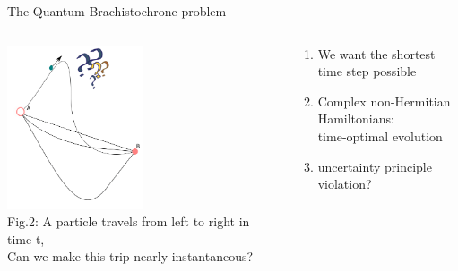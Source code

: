 \documentclass[10pt]{beamer}
\begin{document}
\begin{frame}{The Quantum Brachistochrone problem}
\vspace{0.5cm}
\begin{columns}
    \hspace{1.5em}
    \begin{column}{\textwidth}
    \includegraphics[width=0.5\textwidth]{optim-gif/optimisation-6}
    \\
    \hspace{1em}
    \tiny{Fig.2:
    A particle travels from left to right in time t,\\
    \hspace{2.4em}
    Can we make this trip nearly instantaneous?}
    \end{column}

    \hspace{-17em}
    \begin{column}{0.5\textwidth}
    \begin{enumerate}
        \item We want the shortest time step possible
        \pause
        \item \textcolor{myNewColorC}{Complex non-Hermitian Hamiltonians:\\ \quad time-optimal evolution}
        \pause
        \item \large{uncertainty principle violation?}
        \vspace{1cm}
    \end{enumerate}
    \end{column}
    \end{columns}
\end{frame}
\end{document}

